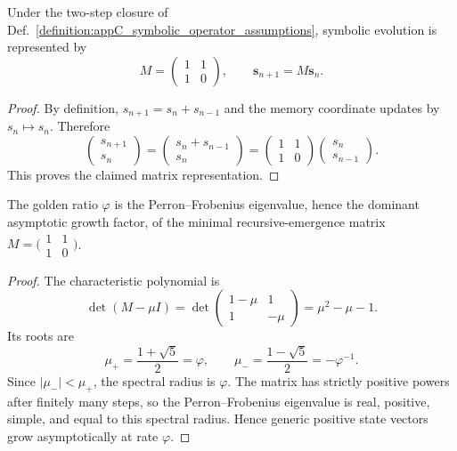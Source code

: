 \begin{lemma}
\label{lemma:appC_matrix_representation_symbolic_operators}
Under the two-step closure of
Def.~\ref{definition:appC_symbolic_operator_assumptions}, symbolic evolution is
represented by
\[
M=\begin{pmatrix}1&1\\1&0\end{pmatrix},
\qquad
\mathbf{s}_{n+1}=M\mathbf{s}_n.
\]
\end{lemma}

\begin{proof}
\label{proof:appC_matrix_rep_symbolic_operators}
By definition,
$s_{n+1}=s_n+s_{n-1}$ and the memory coordinate updates by
$s_n\mapsto s_n$. Therefore
\[
\begin{pmatrix}s_{n+1}\\s_n\end{pmatrix}
=\begin{pmatrix}s_n+s_{n-1}\\s_n\end{pmatrix}
=\begin{pmatrix}1&1\\1&0\end{pmatrix}
\begin{pmatrix}s_n\\s_{n-1}\end{pmatrix}.
\]
This proves the claimed matrix representation.
\end{proof}

\begin{theorem}
\label{theorem:appC_phi_eigenvalue_recursive_emergence}
The golden ratio $\varphi$ is the Perron--Frobenius eigenvalue, hence the dominant
asymptotic growth factor, of the minimal recursive-emergence matrix
$M=\bigl(\begin{smallmatrix}1&1\\1&0\end{smallmatrix}\bigr)$.
\end{theorem}

\begin{proof}
\label{proof:appC_phi_eigenvalue_recursive_emergence}
The characteristic polynomial is
\[
\det(M-\mu I)=\det\begin{pmatrix}1-\mu&1\\1&-\mu\end{pmatrix}
=\mu^2-\mu-1.
\]
Its roots are
\[
\mu_+=\frac{1+\sqrt5}{2}=\varphi,
\qquad
\mu_- =\frac{1-\sqrt5}{2}=-\varphi^{-1}.
\]
Since $|\mu_-|<\mu_+$, the spectral radius is $\varphi$. The matrix has strictly
positive powers after finitely many steps, so the Perron--Frobenius eigenvalue is
real, positive, simple, and equal to this spectral radius. Hence generic positive
state vectors grow asymptotically at rate $\varphi$.
\end{proof}

